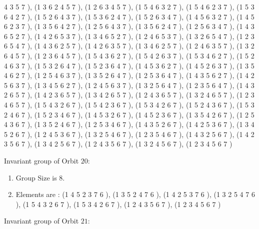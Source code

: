 \documentclass[12pt]{article}
\begin{document}
\begin{enumerate}
4 3 5 7  ), (1 3 6 2 4 5 7  ), (1 2 6 3 4 5 7  ), (1 5 4 6 3 2 7  ), (1 5 4 6 2 3 7  ), (1 5 3 6 4 2 7  ), (1 5 2 6 4 3 7  ), (1 5 3 6 2 4 7  ), (1 5 2 6 3 4 7  ), (1 4 5 6 3 2 7  ), (1 4 5 6 2 3 7  ), (1 3 5 6 4 2 7  ), (1 2 5 6 4 3 7  ), (1 3 5 6 2 4 7  ), (1 2 5 6 3 4 7  ), (1 4 3 6 5 2 7  ), (1 4 2 6 5 3 7  ), (1 3 4 6 5 2 7  ), (1 2 4 6 5 3 7  ), (1 3 2 6 5 4 7  ), (1 2 3 6 5 4 7  ), (1 4 3 6 2 5 7  ), (1 4 2 6 3 5 7  ), (1 3 4 6 2 5 7  ), (1 2 4 6 3 5 7  ), (1 3 2 6 4 5 7  ), (1 2 3 6 4 5 7  ), (1 5 4 3 6 2 7  ), (1 5 4 2 6 3 7  ), (1 5 3 4 6 2 7  ), (1 5 2 4 6 3 7  ), (1 5 3 2 6 4 7  ), (1 5 2 3 6 4 7  ), (1 4 5 3 6 2 7  ), (1 4 5 2 6 3 7  ), (1 3 5 4 6 2 7  ), (1 2 5 4 6 3 7  ), (1 3 5 2 6 4 7  ), (1 2 5 3 6 4 7  ), (1 4 3 5 6 2 7  ), (1 4 2 5 6 3 7  ), (1 3 4 5 6 2 7  ), (1 2 4 5 6 3 7  ), (1 3 2 5 6 4 7  ), (1 2 3 5 6 4 7  ), (1 4 3 2 6 5 7  ), (1 4 2 3 6 5 7  ), (1 3 4 2 6 5 7  ), (1 2 4 3 6 5 7  ), (1 3 2 4 6 5 7  ), (1 2 3 4 6 5 7  ), (1 5 4 3 2 6 7  ), (1 5 4 2 3 6 7  ), (1 5 3 4 2 6 7  ), (1 5 2 4 3 6 7  ), (1 5 3 2 4 6 7  ), (1 5 2 3 4 6 7  ), (1 4 5 3 2 6 7  ), (1 4 5 2 3 6 7  ), (1 3 5 4 2 6 7  ), (1 2 5 4 3 6 7  ), (1 3 5 2 4 6 7  ), (1 2 5 3 4 6 7  ), (1 4 3 5 2 6 7  ), (1 4 2 5 3 6 7  ), (1 3 4 5 2 6 7  ), (1 2 4 5 3 6 7  ), (1 3 2 5 4 6 7  ), (1 2 3 5 4 6 7  ), (1 4 3 2 5 6 7  ), (1 4 2 3 5 6 7  ), (1 3 4 2 5 6 7  ), (1 2 4 3 5 6 7  ), (1 3 2 4 5 6 7  ), (1 2 3 4 5 6 7  )
\end{enumerate}
Invariant group of Orbit $20$:
\begin{enumerate}
\item Group Size is $8$.
\item Elements are : (1 4 5 2 3 7 6  ), (1 3 5 2 4 7 6  ), (1 4 2 5 3 7 6  ), (1 3 2 5 4 7 6  ), (1 5 4 3 2 6 7  ), (1 5 3 4 2 6 7  ), (1 2 4 3 5 6 7  ), (1 2 3 4 5 6 7  )
\end{enumerate}
Invariant group of Orbit $21$:
\end{document}
